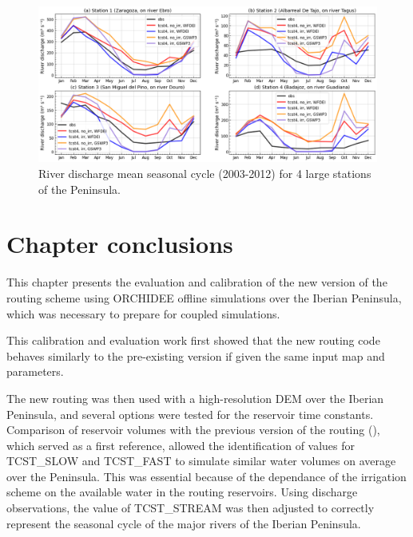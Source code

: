 \begin{figure}[htbp]
    \centering
    \includegraphics[width=\linewidth]{images/eval_halfdeg/river_discharge/merit_forcing_4stations_SC.png}
    \caption{River discharge mean seasonal cycle (2003-2012) for 4 large stations of the Peninsula.}
    \label{fig:merit_forcing_stations_SC}
\end{figure}

\section{Chapter conclusions}

This chapter presents the evaluation and calibration of the new version of the routing scheme using ORCHIDEE offline simulations  over the Iberian Peninsula, which was necessary to prepare for coupled simulations.

This calibration and evaluation work first showed that the new routing code behaves similarly to the pre-existing version if given the same input map and parameters.%

The new routing was then used with a high-resolution DEM over the Iberian Peninsula, and several options were tested for the reservoir time constants. 
Comparison of reservoir volumes with the previous version of the routing (\std), which served as a first reference, allowed the identification of values for TCST\_SLOW and TCST\_FAST to simulate similar water volumes on average over the Peninsula. This was essential because of the dependance of the irrigation scheme on the available water in the routing reservoirs.
Using discharge observations, the value of TCST\_STREAM was then adjusted to correctly represent the seasonal cycle of the major rivers of the Iberian Peninsula.

